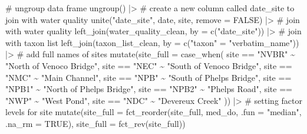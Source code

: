 \documentclass[
  letterpaper,
  DIV=11,
  numbers=noendperiod]{scrartcl}
\newenvironment{Shaded}{\begin{snugshade}}{\end{snugshade}}
\newcommand{\AttributeTok}[1]{\textcolor[rgb]{0.40,0.45,0.13}{#1}}
\newcommand{\CommentTok}[1]{\textcolor[rgb]{0.37,0.37,0.37}{#1}}
\newcommand{\ConstantTok}[1]{\textcolor[rgb]{0.56,0.35,0.01}{#1}}
\newcommand{\FunctionTok}[1]{\textcolor[rgb]{0.28,0.35,0.67}{#1}}
\newcommand{\NormalTok}[1]{\textcolor[rgb]{0.00,0.23,0.31}{#1}}
\newcommand{\OtherTok}[1]{\textcolor[rgb]{0.00,0.23,0.31}{#1}}
\newcommand{\SpecialCharTok}[1]{\textcolor[rgb]{0.37,0.37,0.37}{#1}}
\newcommand{\StringTok}[1]{\textcolor[rgb]{0.13,0.47,0.30}{#1}}
\begin{document}
\begin{Shaded}
\begin{Highlighting}[]
  \CommentTok{\# ungroup data frame}
  \FunctionTok{ungroup}\NormalTok{() }\SpecialCharTok{|\textgreater{}} 
  \CommentTok{\# create a new column called \textasciigrave{}date\_site\textasciigrave{} to join with water quality}
  \FunctionTok{unite}\NormalTok{(}\StringTok{"date\_site"}\NormalTok{, date, site, }\AttributeTok{remove =} \ConstantTok{FALSE}\NormalTok{) }\SpecialCharTok{|\textgreater{}} 
  \CommentTok{\# join with water quality}
  \FunctionTok{left\_join}\NormalTok{(water\_quality\_clean, }\AttributeTok{by =} \FunctionTok{c}\NormalTok{(}\StringTok{"date\_site"}\NormalTok{)) }\SpecialCharTok{|\textgreater{}} 
  \CommentTok{\# join with taxon list}
  \FunctionTok{left\_join}\NormalTok{(taxon\_list\_clean, }\AttributeTok{by =} \FunctionTok{c}\NormalTok{(}\StringTok{"taxon"} \OtherTok{=} \StringTok{"verbatim\_name"}\NormalTok{)) }\SpecialCharTok{|\textgreater{}} 
  \CommentTok{\# add full names of sites}
  \FunctionTok{mutate}\NormalTok{(}\AttributeTok{site\_full =} \FunctionTok{case\_when}\NormalTok{(}
\NormalTok{    site }\SpecialCharTok{==} \StringTok{"NVBR"} \SpecialCharTok{\textasciitilde{}} \StringTok{"North of Venoco Bridge"}\NormalTok{,}
\NormalTok{    site }\SpecialCharTok{==} \StringTok{"NEC"} \SpecialCharTok{\textasciitilde{}} \StringTok{"South of Venoco Bridge"}\NormalTok{,}
\NormalTok{    site }\SpecialCharTok{==} \StringTok{"NMC"} \SpecialCharTok{\textasciitilde{}} \StringTok{"Main Channel"}\NormalTok{,}
\NormalTok{    site }\SpecialCharTok{==} \StringTok{"NPB"} \SpecialCharTok{\textasciitilde{}} \StringTok{"South of Phelps Bridge"}\NormalTok{,}
\NormalTok{    site }\SpecialCharTok{==} \StringTok{"NPB1"} \SpecialCharTok{\textasciitilde{}} \StringTok{"North of Phelps Bridge"}\NormalTok{,}
\NormalTok{    site }\SpecialCharTok{==} \StringTok{"NPB2"} \SpecialCharTok{\textasciitilde{}} \StringTok{"Phelps Road"}\NormalTok{,}
\NormalTok{    site }\SpecialCharTok{==} \StringTok{"NWP"} \SpecialCharTok{\textasciitilde{}}  \StringTok{"West Pond"}\NormalTok{,}
\NormalTok{    site }\SpecialCharTok{==} \StringTok{"NDC"} \SpecialCharTok{\textasciitilde{}} \StringTok{"Devereux Creek"}
\NormalTok{  )) }\SpecialCharTok{|\textgreater{}} 
  \CommentTok{\# setting factor levels for site}
  \FunctionTok{mutate}\NormalTok{(}\AttributeTok{site\_full =} \FunctionTok{fct\_reorder}\NormalTok{(site\_full, med\_do, }\AttributeTok{.fun =} \StringTok{"median"}\NormalTok{, }\AttributeTok{.na\_rm =} \ConstantTok{TRUE}\NormalTok{),}
         \AttributeTok{site\_full =} \FunctionTok{fct\_rev}\NormalTok{(site\_full))}
\end{Highlighting}
\end{Shaded}
\end{document}
